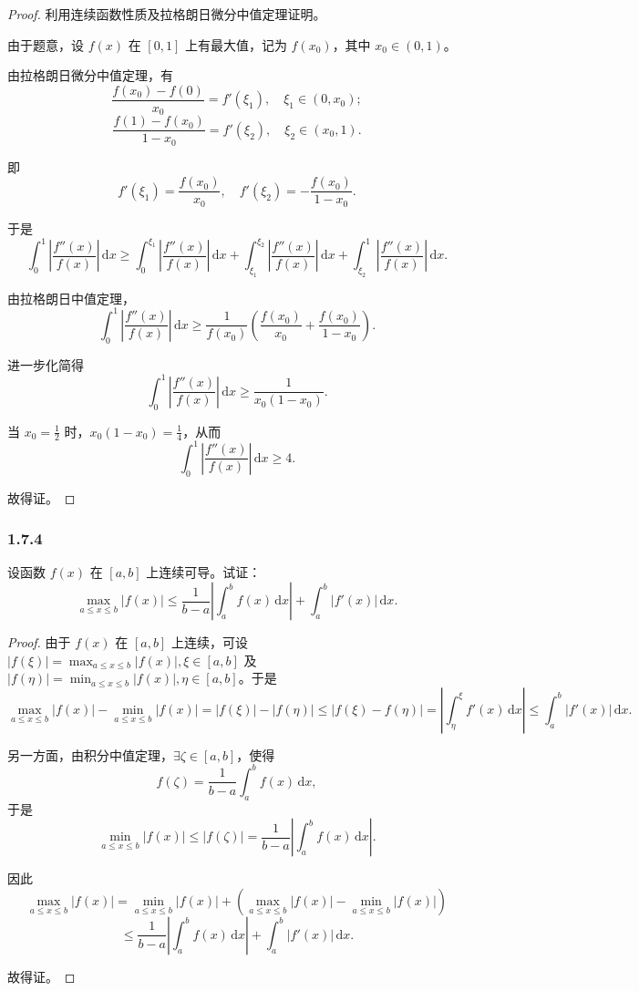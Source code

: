 \documentclass[12pt]{ctexart}
\begin{document}
\begin{proof}
利用连续函数性质及拉格朗日微分中值定理证明。

由于题意，设 $f(x)$ 在 $[0, 1]$ 上有最大值，记为 $f(x_0)$，其中 $x_0 \in (0, 1)$。

由拉格朗日微分中值定理，有
\[
\frac{f(x_0) - f(0)}{x_0} = f'(\xi_1), \quad \xi_1 \in (0, x_0);
\]
\[
\frac{f(1) - f(x_0)}{1 - x_0} = f'(\xi_2), \quad \xi_2 \in (x_0, 1).
\]

即
\[
f'(\xi_1) = \frac{f(x_0)}{x_0}, \quad f'(\xi_2) = -\frac{f(x_0)}{1 - x_0}.
\]

于是
\[
\int_{0}^{1} \left| \frac{f''(x)}{f(x)} \right| \, \mathrm{d}x 
\geq \int_{0}^{\xi_1} \left| \frac{f''(x)}{f(x)} \right| \, \mathrm{d}x + \int_{\xi_1}^{\xi_2} \left| \frac{f''(x)}{f(x)} \right| \, \mathrm{d}x + \int_{\xi_2}^{1} \left| \frac{f''(x)}{f(x)} \right| \, \mathrm{d}x.
\]

由拉格朗日中值定理，
\[
\int_{0}^{1} \left| \frac{f''(x)}{f(x)} \right| \, \mathrm{d}x \geq \frac{1}{f(x_0)} \left( \frac{f(x_0)}{x_0} + \frac{f(x_0)}{1 - x_0} \right).
\]

进一步化简得
\[
\int_{0}^{1} \left| \frac{f''(x)}{f(x)} \right| \, \mathrm{d}x \geq \frac{1}{x_0 (1 - x_0)}.
\]

当 $x_0 = \frac{1}{2}$ 时，$x_0(1 - x_0) = \frac{1}{4}$，从而
\[
\int_{0}^{1} \left| \frac{f''(x)}{f(x)} \right| \, \mathrm{d}x \geq 4.
\]

故得证。
\end{proof}

\subsubsection*{1.7.4}

设函数 $f(x)$ 在 $[a, b]$ 上连续可导。试证：
\[
\max_{a \leq x \leq b} |f(x)| \leq \frac{1}{b-a} \left| \int_{a}^{b} f(x) \, \mathrm{d}x \right| + \int_{a}^{b} |f'(x)| \, \mathrm{d}x.
\]
\begin{proof}
由于 $f(x)$ 在 $[a, b]$ 上连续，可设 $|f(\xi)| = \max_{a \leq x \leq b} |f(x)|, \xi \in [a, b]$ 及
$|f(\eta)| = \min_{a \leq x \leq b} |f(x)|, \eta \in [a, b]$。于是
\[
\max_{a \leq x \leq b} |f(x)| - \min_{a \leq x \leq b} |f(x)| = |f(\xi)| - |f(\eta)| \leq |f(\xi) - f(\eta)|
= \left| \int_{\eta}^{\xi} f'(x) \, \mathrm{d}x \right| \leq \int_{a}^{b} |f'(x)| \, \mathrm{d}x.
\]

另一方面，由积分中值定理，$\exists \zeta \in [a, b]$，使得
\[
f(\zeta) = \frac{1}{b-a} \int_{a}^{b} f(x) \, \mathrm{d}x,
\]
于是
\[
\min_{a \leq x \leq b} |f(x)| \leq |f(\zeta)| = \frac{1}{b-a} \left| \int_{a}^{b} f(x) \, \mathrm{d}x \right|.
\]

因此
\[
\max_{a \leq x \leq b} |f(x)| = \min_{a \leq x \leq b} |f(x)| + (\max_{a \leq x \leq b} |f(x)| - \min_{a \leq x \leq b} |f(x)|)
\]
\[
\leq \frac{1}{b-a} \left| \int_{a}^{b} f(x) \, \mathrm{d}x \right| + \int_{a}^{b} |f'(x)| \, \mathrm{d}x.
\]

故得证。
\end{proof}
\end{document}
